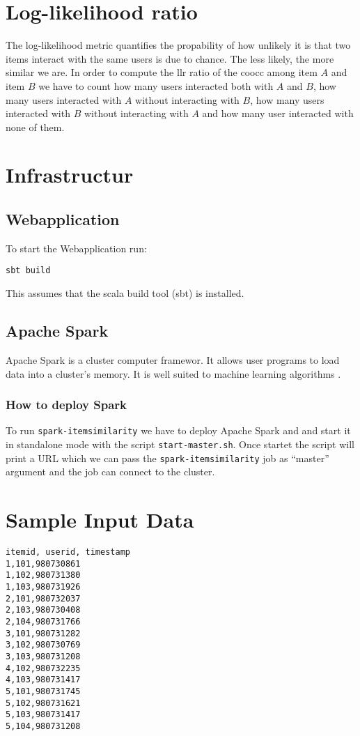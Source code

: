 \section{Log-likelihood ratio}
\label{sec:llrratio}
The log-likelihood metric quantifies the propability of how
unlikely it is that two items interact with the same users is due to chance. The less likely, the more similar we are.
In order to compute the \gls{llr} ratio of the \gls{coocc} among item $A$ and item $B$ we have to count how many users interacted both with $A$ and $B$, how many users interacted with $A$ without interacting with $B$, how many users interacted with $B$ without interacting with $A$ and how many user interacted with none of them.


\section{Infrastructur}
\label{sec:infrastructur}

\subsection{Webapplication}
\label{sec:web}

To start the Webapplication run:
\begin{verbatim}
sbt build 
\end{verbatim}
This assumes that the scala build tool (sbt) is installed.
\subsection{Apache Spark}
\label{sec:spark}
Apache Spark is a cluster computer framewor. It allows user programs to load data into a cluster's memory. It is well suited to machine learning algorithms \cite{Karau}.
\subsubsection{How to deploy Spark}
\label{sec:sparkdeploy}

To run \verb|spark-itemsimilarity| we have to deploy Apache Spark and and start it in standalone mode with the script \verb|start-master.sh|. Once startet the script will print a URL which we can pass the \verb|spark-itemsimilarity| job as ``master'' argument and the job can connect to the cluster. 

\section{Sample Input Data}
\label{sec:sampleinput}

\begin{lstlisting}[label=lst:sampledata]
itemid, userid, timestamp
1,101,980730861
1,102,980731380
1,103,980731926
2,101,980732037
2,103,980730408
2,104,980731766
3,101,980731282
3,102,980730769
3,103,980731208
4,102,980732235
4,103,980731417
5,101,980731745
5,102,980731621
5,103,980731417
5,104,980731208  
\end{lstlisting}

